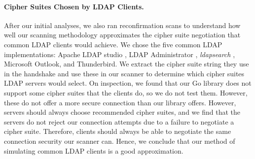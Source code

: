 
\paragraph{Cipher Suites Chosen by LDAP Clients.} After our initial analyses, we also ran reconfirmation scans to understand how well our scanning methodology approximates the cipher suite negotiation that common LDAP clients would achieve.
We chose the five common LDAP implementations: Apache LDAP studio \cite{apacheldapstudio}, LDAP Administrator \cite{ldapadministrator}, \textit{ldapsearch} \cite{LdapsearchCommandLineTool}, Microsoft Outlook, and Thunderbird. 
We extract the cipher suite string they use in the handshake and use these in our scanner to determine which cipher suites LDAP servers would select.
On inspection, we found that our Go library does not support some cipher suites that the clients do, so we do not test them. However, these do not offer a more secure connection than our library offers.
However, servers should always choose recommended cipher suites, and we find that the servers do not reject our connection attempts due to a failure to negotiate a cipher suite. Therefore, clients should always be able to negotiate the same connection security our scanner can. Hence, we conclude that our method of simulating common LDAP clients is a good approximation.


